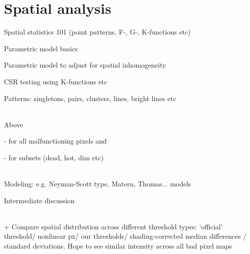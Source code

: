 \documentclass[../../IO-Pixels.tex]{subfiles}
\begin{document}
\section{Spatial analysis}
\begin{outline}
Spatial statistics 101 (point patterns, F-, G-, K-functions etc)

Parametric model basics

Parametric model to adjust for spatial inhomogeneity

CSR testing using K-functions etc

Patterns: singletons, pairs, clusters, lines, bright lines etc

\\
Above 

- for all malfunctioning pixels and 

- for subsets (dead, hot, dim etc)

\\
Modeling: e.g. Neyman-Scott type, Matern, Thomas... models

Intermediate discussion

\\
+ Compare spatial distribution across different threshold types: `official' threshold/ nonlinear px/ our thresholds/ shading-corrected median differences / standard deviations. Hope to see similar intensity across all bad pixel maps
\end{outline}


\end{document}
